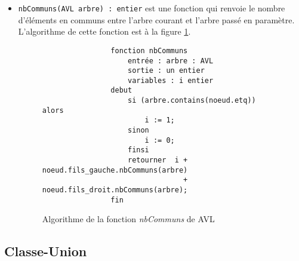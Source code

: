 \documentclass[a4paper]{article}
\begin{document}
\begin{itemize}
			\item \verb|nbCommuns(AVL arbre) : entier| est une fonction qui renvoie le nombre d'éléments en communs entre l'arbre courant et l'arbre passé en paramètre. L'algorithme de cette fonction est à la figure \ref{algo_nbCommuns}.
			
			\begin{figure}
	    	    \begin{verbatim}
	    	    fonction nbCommuns
	    	        entrée : arbre : AVL
	    	        sortie : un entier
	    	        variables : i entier
	    	    debut
	    	        si (arbre.contains(noeud.etq)) alors
	    	            i := 1;
	    	        sinon
	    	            i := 0;
	    	        finsi
	    	        retourner  i + noeud.fils_gauche.nbCommuns(arbre) 
	    	                     + noeud.fils_droit.nbCommuns(arbre);
	    	    fin
	    	    \end{verbatim}
	    	    \caption{Algorithme de la fonction \textit{nbCommuns} de AVL \label{algo_nbCommuns} }
	    	 \end{figure}
	    	 
		\end{itemize}
		
		\subsection{Classe-Union}
\end{document}

